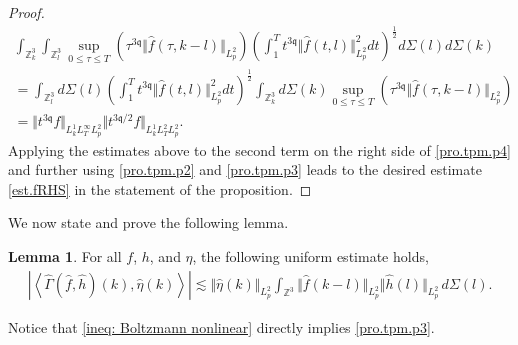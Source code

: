 \documentclass[reqno]{amsart}
\newcommand{\pv}{p}
\def\norm#1{\big\Vert#1\big\Vert}
\newcommand{\irnp}[2]{\left\langle {#1},{#2} \right\rangle}
\newcommand{\qq}{\mathfrak{q}}
\newcommand{\tTq}{t^{3\qq}}
\newcommand{\Z}{\mathbb{Z}}
\theoremstyle{definition}
\newtheorem{lemma}[theorem]{Lemma}
\numberwithin{equation}{section}
\numberwithin{theorem}{section}
\begin{document}
\begin{proof}
\begin{multline*}
    \int_{\Z^3_k} \int_{\Z^3_l} \sup_{0\le \tau\le T} \left( \tau^{3\qq}\Vert \hat{f}(\tau,k-l) \Vert_{L^2_{\pv}}\right) \left(\int^{T}_{1} \tTq\norm{\hat{f}(t,l)}_{L^2_{\pv}}^2 dt\right)^{\frac12}d\Sigma(l) d\Sigma(k)
\\
= \int_{\Z^3_l}  d\Sigma(l)\left(\int^{T}_{1} \tTq\norm{\hat{f}(t,l)}_{L^2_{\pv}}^2 dt\right)^{\frac12} \int_{\Z^3_k}d\Sigma(k) \sup_{0\le \tau\le T} \left( \tau^{3\qq}\Vert \hat{f}(\tau,k-l) \Vert_{L^2_{\pv}}\right) 
\\
=\Vert \tTq{f}\Vert_{L^1_kL^\infty_TL^2_{\pv}}
\Vert t^{3\qq/2} {f}\Vert_{L^1_kL^2_TL^2_{\pv}}.
\end{multline*}
Applying the estimates above to the second term on the right side of \eqref{pro.tpm.p4} and further using \eqref{pro.tpm.p2} and \eqref{pro.tpm.p3} leads to the desired estimate \eqref{est.fRHS} in the statement of the proposition.
\end{proof}


We now state and prove the following lemma.

\begin{lemma}\label{lem: Boltzmann nonlinear}
For all \(f\), \(h\), and \(\eta\), the following uniform estimate holds,
\begin{align}\label{ineq: Boltzmann nonlinear}
\left| \irnp{\widehat{\Gamma}(\hat{f},\hat{h})(k)}{\hat{\eta}(k)}\right|\lesssim \norm{\hat{\eta}(k)}_{L^2_{\pv}}\int_{\Z^3}\Vert \hat{f}(k-l)\Vert_{L^2_{\pv}} \norm{\hat{h}(l)}_{L^2_{\pv}}  \,d\Sigma(l).
\end{align}
\end{lemma}

Notice that \eqref{ineq: Boltzmann nonlinear} directly implies \eqref{pro.tpm.p3}.
\end{document}
